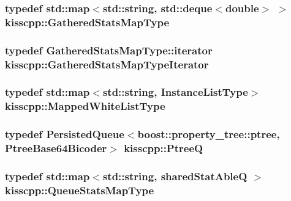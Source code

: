 \hypertarget{a00089_a4c76f7ad5a35f6bd51154a961f9c0d7d}{
\subsubsection[{Gathered\-Stats\-Map\-Type}]{\setlength{\rightskip}{0pt plus 5cm}typedef std\-::map$<$std\-::string, std\-::deque$<$double$>$ $>$ {\bf kisscpp\-::\-Gathered\-Stats\-Map\-Type}}}\label{a00089_a4c76f7ad5a35f6bd51154a961f9c0d7d}
\hypertarget{a00089_a53ec1a09258369be8737e6ec2f93961c}{
\subsubsection[{Gathered\-Stats\-Map\-Type\-Iterator}]{\setlength{\rightskip}{0pt plus 5cm}typedef Gathered\-Stats\-Map\-Type\-::iterator {\bf kisscpp\-::\-Gathered\-Stats\-Map\-Type\-Iterator}}}\label{a00089_a53ec1a09258369be8737e6ec2f93961c}
\hypertarget{a00089_a33979b59a2b404e85c9416071d843412}{
\subsubsection[{Mapped\-White\-List\-Type}]{\setlength{\rightskip}{0pt plus 5cm}typedef std\-::map$<$std\-::string, {\bf Instance\-List\-Type}$>$ {\bf kisscpp\-::\-Mapped\-White\-List\-Type}}}\label{a00089_a33979b59a2b404e85c9416071d843412}
\hypertarget{a00089_af1d6724570f46ac378171bd45ddf6903}{
\subsubsection[{Ptree\-Q}]{\setlength{\rightskip}{0pt plus 5cm}typedef {\bf Persisted\-Queue}$<$boost\-::property\-\_\-tree\-::ptree, {\bf Ptree\-Base64\-Bicoder}$>$ {\bf kisscpp\-::\-Ptree\-Q}}}\label{a00089_af1d6724570f46ac378171bd45ddf6903}
\hypertarget{a00089_a36c7aee4be6fad3cc8ab5ec896e1f9a5}{
\subsubsection[{Queue\-Stats\-Map\-Type}]{\setlength{\rightskip}{0pt plus 5cm}typedef std\-::map$<$std\-::string, {\bf shared\-Stat\-Able\-Q} $>$ {\bf kisscpp\-::\-Queue\-Stats\-Map\-Type}}}\label{a00089_a36c7aee4be6fad3cc8ab5ec896e1f9a5}
